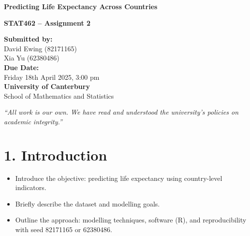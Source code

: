 \documentclass[11pt,a4paper]{article}
\begin{document}
\begin{titlepage}
    \centering
    \vspace*{3cm}
    
    {\Huge\bfseries Predicting Life Expectancy Across Countries\par}
    \vspace{1.5cm}
    
    {\Large\bfseries STAT462 – Assignment 2\par}
    \vspace{2cm}
    
    \begin{flushleft}
        \textbf{Submitted by:}\\
        David Ewing (82171165)\\
        Xia Yu (62380486)\\[1.5cm]

        \textbf{Due Date:}\\
        Friday 18th April 2025, 3:00 pm\\[1.5cm]

        \textbf{University of Canterbury}\\
        School of Mathematics and Statistics\\[1cm]
    \end{flushleft}

    \vfill
    \begin{flushright}
        \textit{“All work is our own. We have read and understood the university's policies on academic integrity.”}
    \end{flushright}
\end{titlepage}

\onehalfspacing


\section*{1. Introduction}
\begin{itemize}
    \item Introduce the objective: predicting life expectancy using country-level indicators.
    \item Briefly describe the dataset and modelling goals.
    \item Outline the approach: modelling techniques, software (R), and reproducibility with seed 82171165 or 62380486.
\end{itemize}
\end{document}
